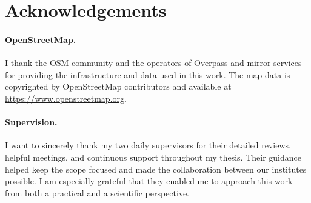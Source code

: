 

\section*{Acknowledgements}
\label{chap:acknowledgements}

\paragraph{OpenStreetMap.} %
I thank the \ac{OSM} community and the operators of Overpass and mirror services for providing the infrastructure and data used in this work. %
The map data is copyrighted by OpenStreetMap contributors and available at \url{https://www.openstreetmap.org}.

\paragraph{Supervision.}

I want to sincerely thank my two daily supervisors for their detailed reviews, helpful meetings, and continuous support throughout my thesis.
Their guidance helped keep the scope focused and made the collaboration between our institutes possible. I am especially grateful that they enabled me to approach this work from both a practical and a scientific perspective. %

